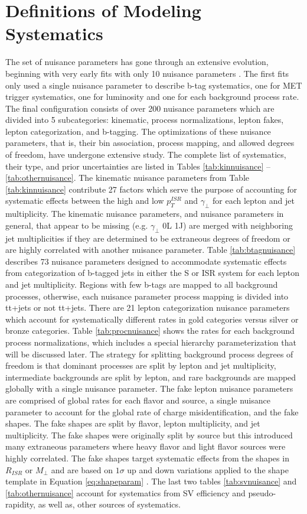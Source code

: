 \section{Definitions of Modeling Systematics}
The set of nuisance parameters has gone through an extensive evolution, beginning with very early fits with only 10 nuisance parameters  \cite{erich}. The first fits only used a single nuisance parameter to describe b-tag systematics, one for MET trigger systematics, one for luminosity and one for each background process rate. The final configuration consists of over 200 nuisance parameters which are divided into 5 subcategories: kinematic, process normalizations, lepton fakes, lepton categorization, and b-tagging. The optimizations of these nuisance parameters, that is, their bin association, process mapping, and  allowed degrees of freedom, have undergone extensive study. The complete list of systematics, their type, and prior uncertainties are listed in Tables \ref{tab:kinnuisance} -- \ref{tab:othernuisance}.  The kinematic nuisance parameters from Table \ref{tab:kinnuisance} contribute 27 factors which serve the purpose of accounting for systematic effects between the high and low $p_T^{ISR}$ and $\gamma_\perp$ for each lepton and jet multiplicity. The kinematic nuisance parameters, and nuisance parameters in general, that appear to be missing (e.g. $\gamma_\perp$ 0L 1J) are merged with neighboring jet multiplicities if they are determined to be extraneous degrees of freedom or are highly correlated with another nuisance parameter. Table \ref{tab:btagnuisance} describes 73 nuisance parameters designed to accommodate systematic effects from categorization of b-tagged jets in either the S or ISR system for each lepton and jet multiplicity. Regions with few b-tags are mapped to all background processes, otherwise, each nuisance parameter process mapping is divided into tt+jets or not tt+jets. There are 21 lepton categorization nuisance parameters which account for systematically different rates in gold categories versus silver or bronze categories. Table \ref{tab:procnuisance} shows the rates for each background process normalizations, which includes a special hierarchy parameterization that will be discussed later. The strategy for splitting background process degrees of freedom is that dominant processes are split by lepton and jet multiplicity, intermediate backgrounds are split by lepton, and rare backgrounds are mapped globally with a single nuisance parameter. The fake lepton nuisance parameters are comprised of global rates for each flavor and source, a single nuisance parameter to account for the global rate of  charge misidentification, and the fake shapes. The fake shapes are split by flavor, lepton multiplicity, and jet multiplicity. The fake shapes were originally split by source but this introduced many extraneous parameters where heavy flavor and light flavor sources were highly correlated. The fake shapes target systematic effects from the shapes in $R_{ISR}$ or $M_\perp$ and are based on $1\sigma$ up and down variations applied to the shape template in Equation \ref{eq:shapeparam} \cite{margaret}. The last two tables \ref{tab:svnuisance} and \ref{tab:othernuisance} account for systematics from SV efficiency and pseudo-rapidity, as well as, other sources of systematics.

